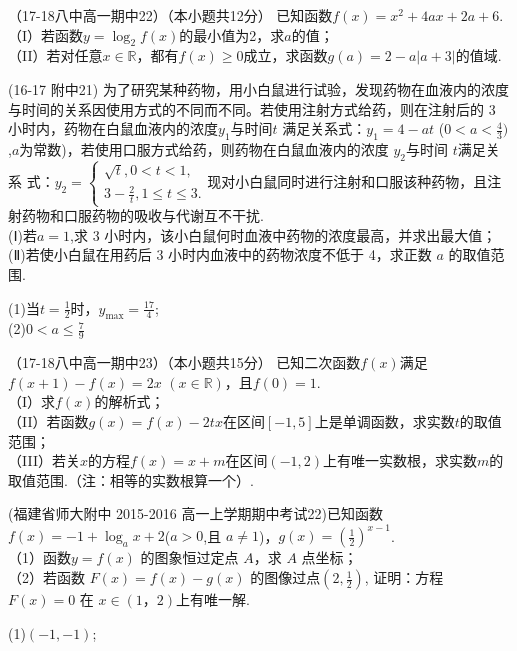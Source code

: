 \item
（17-18八中高一期中22）（本小题共12分）
已知函数$f(x)=x^2+4ax+2a+6 $.\\
（I）若函数$y=\log_2f(x)$的最小值为2，求$a$的值；\\
（II）若对任意$x\in\mathbb{R}$，都有$f(x)\geq0$成立，求函数$g(a)=2-a|a+3| $的值域.\\

\item
(16-17 附中21) 为了研究某种药物，用小白鼠进行试验，发现药物在血液内的浓度与时间的关系因使用方式的不同而不同。若使用注射方式给药，则在注射后的 3 小时内，药物在白鼠血液内的浓度$y_1$与时间$t$ 满足关系式：$y_1 =4-at$ ($0<a<\frac{4}{3})$,$a$为常数)，若使用口服方式给药，则药物在白鼠血液内的浓度 $y_2$与时间 $t$满足关系 式：$y_2=\begin{cases}\sqrt{t},0<t<1,\\3-\frac{2}{t},1\leq t\leq3.\end{cases}$现对小白鼠同时进行注射和口服该种药物，且注射药物和口服药物的吸收与代谢互不干扰.\\
(Ⅰ)若$a=1$,求 3 小时内，该小白鼠何时血液中药物的浓度最高，并求出最大值；\\
(Ⅱ)若使小白鼠在用药后 3 小时内血液中的药物浓度不低于 4，求正数 $a$ 的取值范围.\\
\begin{answers}
(1)当$t=\frac12$时，$y_{\max}=\frac{17}{4}$;\\
(2)$0<a\leq\frac{7}{9}$
\end{answers}


\item
（17-18八中高一期中23）（本小题共15分）
已知二次函数$f(x)$满足$f(x+1)-f(x)=2x $ $(x\in\mathbb{R})$，且$f(0)=1$.\\
（I）求$f(x)$的解析式；\\
（II）若函数$g(x)=f(x)-2tx$在区间$[-1,5]$上是单调函数，求实数$t$的取值范围；\\
（III）若关$x$的方程$f(x)=x+m $在区间$(-1,2)$上有唯一实数根，求实数$m$的取值范围.（注：相等的实数根算一个）.\\

\item (福建省师大附中 2015-2016 高一上学期期中考试22)已知函数$f(x)=-1+\log_a{x+2}$($a>0$,且 $a \neq1$)，$g(x)=(\frac12)^{x-1}$.\\
（1）函数$ y= f (x )$ 的图象恒过定点 $A$，求 $A$ 点坐标；\\
（2）若函数 $F ( x )= f ( x )- g ( x )$ 的图像过点$(2,\frac12)$, 证明：方程 $F ( x )= 0$ 在 $x\in(1，2)$上有唯一解.
\begin{answer}
(1)$(-1,-1)$;\\
\end{answer}

